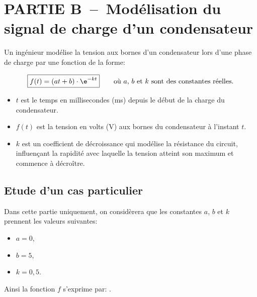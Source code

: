 \medskip

\section*{PARTIE B~--~Modélisation du signal de charge d'un condensateur}

Un ingénieur modélise la tension aux bornes d'un condensateur lors d'une phase de charge par une fonction de la forme:

\[\boxed{f(t)=(at+b)\cdot \e^{-kt}}\qquad \text{où $a$, $b$ et $k$ sont des constantes réelles.}\]

\begin{itemize}
    \item $t$ est le temps en millisecondes (ms) depuis le début de la charge du condensateur.
    \item $f(t)$ est la tension en volts (V) aux bornes du condensateur à l'instant $t$.
    \item $k$ est un coefficient de décroissance qui modélise la résistance du circuit, influençant la rapidité avec laquelle la tension atteint son maximum et commence à décroître.
\end{itemize}

\subsection*{Etude d'un cas particulier}

    Dans cette partie uniquement, on considèrera que les constantes $a$, $b$ et $k$ prennent les valeurs suivantes:

    \begin{minipage}{0.28\textwidth}
\begin{itemize}
    \item $a=0$,
    \item $b=5$,
    \item $k=0,5$.
\end{itemize}
\end{minipage}\hfill{}
\begin{minipage}{0.68\textwidth}
    Ainsi la fonction $f$ s'exprime par: .

\end{minipage}



